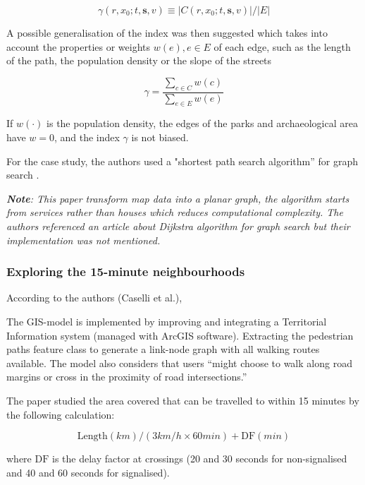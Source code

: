 $$ \gamma(r,x_0;t,\mathbf s,v)\equiv|C(r,x_0;t,\mathbf s,v)|/|E| $$

A possible generalisation of the index was then suggested which takes into account the properties or weights $w(e),e\in E$ of each edge, such as the length of the path, the population density or the slope of the streets

$$ \gamma=\frac{\sum_{c\in C}w(c)}{\sum_{e\in E}w(e)} $$

If $w(\cdot)$ is the population density, the edges of the parks and archaeological area have $w = 0$, and the index $\gamma$ is not biased.

For the case study, the authors used a "shortest path search algorithm” for graph search \cite{dijkstra_note_1959}.

\textit{\textbf{Note}: This paper transform map data into a planar graph, the algorithm starts from services rather than houses which reduces computational complexity. The authors referenced an article about Dijkstra algorithm for graph search but their implementation was not mentioned.}

\subsubsection{Exploring the 15-minute neighbourhoods \texorpdfstring{\cite{caselli_exploring_2022}}{}} \label{caselli_exploring_2022}

According to the authors (Caselli et al.), 

The GIS-model is implemented by improving and integrating a Territorial Information system (managed with ArcGIS software). Extracting the pedestrian paths feature class to generate a link-node graph with all walking routes available. The model also considers that users “might choose to walk along road margins or cross in the proximity of road intersections.”

The paper studied the area covered that can be travelled to  within 15 minutes by the following calculation:

$$\text{Length}(km) / (3 km/h \times 60 min) + \text{DF} (min)$$

where $\text{DF}$ is the delay factor at crossings (20 and 30 seconds for non-signalised and 40 and 60 seconds for signalised).

